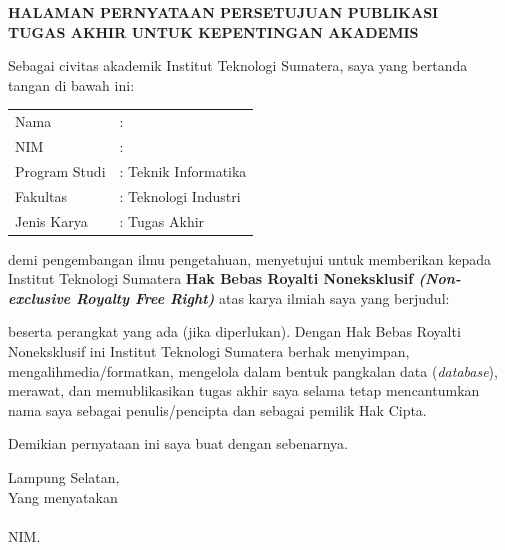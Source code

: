 \clearpage
{}%

\begin{center}
	\smallskip
	
	\normalsize \bfseries \MakeUppercase{
		HALAMAN PERNYATAAN PERSETUJUAN PUBLIKASI \\
		TUGAS AKHIR UNTUK KEPENTINGAN AKADEMIS
	}\linebreak
	
	\normalfont \onehalfspacing \justifying
	Sebagai civitas akademik Institut Teknologi Sumatera, saya yang bertanda tangan di bawah ini:
	
	\flushleft
	\setlength{\tabcolsep}{0pt}
	\begin{tabular}{l l}
		Nama 			&  : \theauthor\\
		NIM 			&  : \printnim\\
		Program Studi 	&  : Teknik Informatika\\
		Fakultas 		&  : Teknologi Industri\\
		Jenis Karya 	&  : Tugas Akhir\\
	\end{tabular}

	\justifying
	\noindent demi pengembangan ilmu pengetahuan, menyetujui untuk memberikan kepada Institut Teknologi Sumatera \textbf{Hak Bebas Royalti Noneksklusif \textit{(Non-exclusive Royalty Free Right)}} atas karya ilmiah saya yang berjudul:
	
	\centering
	\textbf{\thetitle}
	
	{\justifying
	\noindent beserta perangkat yang ada (jika diperlukan). Dengan Hak Bebas Royalti Noneksklusif ini Institut Teknologi Sumatera berhak menyimpan, mengalihmedia/formatkan, mengelola dalam bentuk pangkalan data (\textit{database}), merawat, dan memublikasikan tugas akhir saya selama tetap mencantumkan nama saya sebagai penulis/pencipta dan sebagai pemilik Hak Cipta.

	Demikian pernyataan ini saya buat dengan sebenarnya. \\
	}
	
	\centering
	Lampung Selatan, \todayIndo\\
	\bigskip
	Yang menyatakan\\
	\vspace{1.5cm}
	\theauthor\\
	NIM. \printnim\\
	
\end{center}
\clearpage
